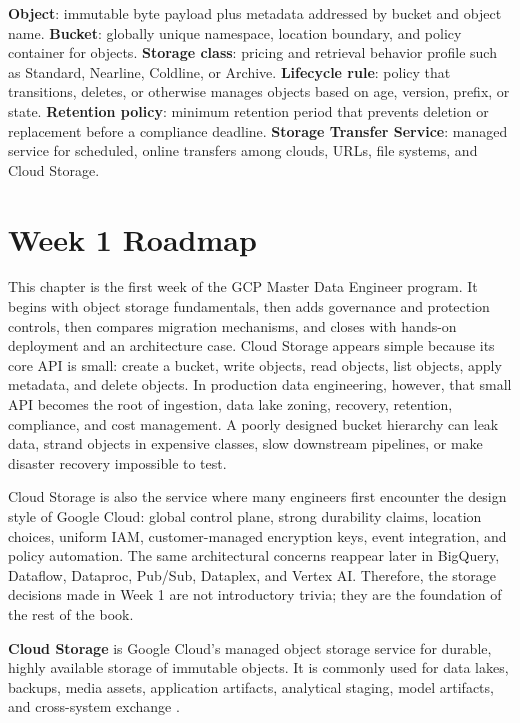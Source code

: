 \begin{keyterms}
\textbf{Object}: immutable byte payload plus metadata addressed by bucket and object name.
\textbf{Bucket}: globally unique namespace, location boundary, and policy container for objects.
\textbf{Storage class}: pricing and retrieval behavior profile such as Standard, Nearline, Coldline, or Archive.
\textbf{Lifecycle rule}: policy that transitions, deletes, or otherwise manages objects based on age, version, prefix, or state.
\textbf{Retention policy}: minimum retention period that prevents deletion or replacement before a compliance deadline.
\textbf{Storage Transfer Service}: managed service for scheduled, online transfers among clouds, URLs, file systems, and Cloud Storage.
\end{keyterms}

\section{Week 1 Roadmap}
This chapter is the first week of the GCP Master Data Engineer program. It begins with object storage fundamentals, then adds governance and protection controls, then compares migration mechanisms, and closes with hands-on deployment and an architecture case. Cloud Storage appears simple because its core API is small: create a bucket, write objects, read objects, list objects, apply metadata, and delete objects. In production data engineering, however, that small API becomes the root of ingestion, data lake zoning, recovery, retention, compliance, and cost management. A poorly designed bucket hierarchy can leak data, strand objects in expensive classes, slow downstream pipelines, or make disaster recovery impossible to test.

Cloud Storage is also the service where many engineers first encounter the design style of Google Cloud: global control plane, strong durability claims, location choices, uniform IAM, customer-managed encryption keys, event integration, and policy automation. The same architectural concerns reappear later in BigQuery, Dataflow, Dataproc, Pub/Sub, Dataplex, and Vertex AI. Therefore, the storage decisions made in Week 1 are not introductory trivia; they are the foundation of the rest of the book.

\begin{definitionbox}
\textbf{Cloud Storage} is Google Cloud's managed object storage service for durable, highly available storage of immutable objects. It is commonly used for data lakes, backups, media assets, application artifacts, analytical staging, model artifacts, and cross-system exchange \cite{googlecloudstorageoverview}.
\end{definitionbox}

